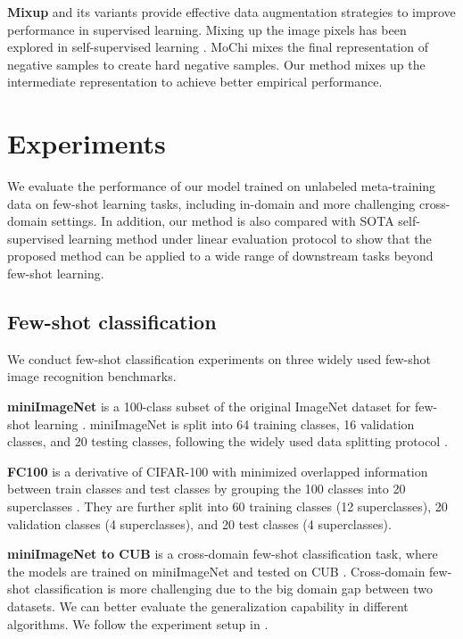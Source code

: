 \documentclass{article}
\renewcommand{\cite}{\citep}
\begin{document}
\textbf{Mixup} \citep{zhang:etal:2018mixup} and its variants \citep{yun:etal:2019cutmix,verma:etal:2019manifold} provide effective data augmentation strategies to improve performance in supervised learning. Mixing up the image pixels has been explored in self-supervised learning \citep{shen:etal:2020unmix,lee:etal:2021imix}. MoChi \citep{Kalantidis:etal:2020} mixes the final representation of negative samples to create hard negative samples. Our method mixes up the intermediate representation to achieve better empirical performance. 

\section{Experiments}
We evaluate the performance of our model trained on unlabeled meta-training data on few-shot learning tasks, including in-domain and more challenging cross-domain settings. In addition, our method is also compared with SOTA self-supervised learning method under linear evaluation protocol to show that the proposed method can be applied to a wide range of downstream tasks beyond few-shot learning.

\subsection{Few-shot classification}
We conduct few-shot classification experiments on three widely used few-shot image recognition benchmarks.

\textbf{miniImageNet} is a 100-class subset of the original ImageNet dataset \citep{deng:etal:2009imagenet} for few-shot learning \citep{vinyals:etal:2016}. miniImageNet is split into 64 training classes, 16 validation classes, and 20 testing classes, following the widely used data splitting protocol \citep{ravi:larochelle:2017}.

\textbf{FC100} is a derivative of CIFAR-100 with minimized overlapped information between train classes and test classes by grouping the 100 classes into 20 superclasses \citep{oreshkin:etal:2018tadam}. They are further split into 60 training classes (12 superclasses), 20 validation classes (4 superclasses), and 20 test classes (4 superclasses).

\textbf{miniImageNet to CUB} is a cross-domain few-shot classification task, where the models are trained on miniImageNet and tested on CUB \citep{Welinder:etal:2010}. Cross-domain few-shot classification is more challenging due to the big domain gap between two datasets. We can better evaluate the generalization capability in different algorithms. We follow the experiment setup in \cite{yue:etal:2020}.
\end{document}
